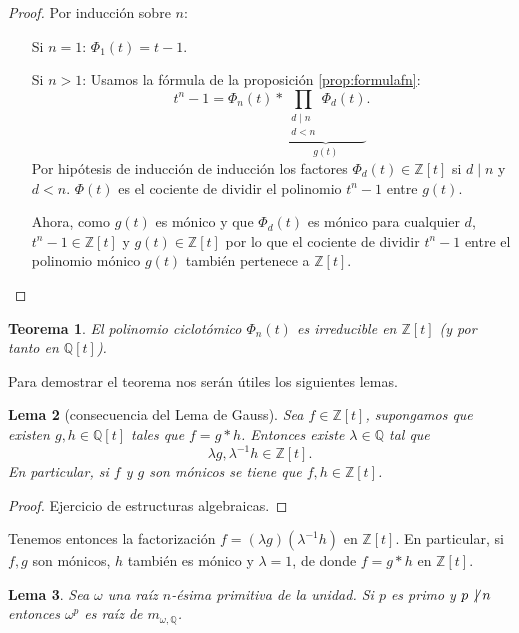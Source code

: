 \documentclass[10pt, spanish]{report}
\newtheorem{tma}{Teorema}[chapter]
\newtheorem{lema}[tma]{Lema}
\theoremstyle{definition}
\theoremstyle{custom}
\theoremstyle{remark}
\newcommand{\Z}{\mathbb{Z}}
\newcommand{\Q}{\mathbb{Q}}
\begin{document}
\begin{proof}
    Por inducción sobre $n$:
    \begin{itemize}[itemindent=30pt]
        \item[Si $n=1$:] $\Phi_1(t)=t-1$. 
        \item[Si $n>1$:] Usamos la fórmula de la proposición
            \ref{prop:formulafn}:
            \[ t^n-1 = \Phi_n(t)*\underbrace{\prod_{\substack{d\mid n\\ d<n}}
            \Phi_d(t)}_{g(t)}.\] 
            Por hipótesis de inducción de inducción los factores
            $\Phi_d(t)\in\Z[t]$ si $d\mid n$ y $d<n$. $\Phi(t)$ es el cociente
            de dividir el polinomio $t^n-1$ entre $g(t)$.       

            Ahora, como $g(t)$ es mónico y que $\Phi_d(t)$ es mónico para
            cualquier $d$, $t^n-1\in\Z[t]$ y $g(t)\in\Z[t]$ por lo que el
            cociente de dividir $t^n-1$ entre el polinomio mónico $g(t)$ también
            pertenece a $\Z[t]$. 
    \end{itemize}
\end{proof}

\begin{tma}\label{tma:pcicloirred}
    El polinomio ciclotómico $\Phi_n(t)$ es irreducible en $\Z[t]$ (y por tanto
    en $\Q[t]$). 
\end{tma}

Para demostrar el teorema nos serán útiles los siguientes lemas.

\begin{lema}[consecuencia del Lema de Gauss]\label{lema:gausszt}
    Sea $f\in\Z[t]$, supongamos que existen $g,h\in\Q[t]$ tales que $f=g*h$.
    Entonces existe $\lambda\in\Q$ tal que \[\lambda g, \lambda^{-1} h\in\Z[t].\]    
    En particular, si $f$ y $g$ son mónicos se tiene que $f,h\in\Z[t]$.   
\end{lema}

\begin{proof}
    Ejercicio de estructuras algebraicas.
\end{proof}

Tenemos entonces la factorización $f=(\lambda g)(\lambda^{-1} h)$ en $\Z[t]$. En
particular, si $f,g$ son mónicos, $h$ también es mónico y $\lambda=1$, de donde
$f=g*h$ en $\Z[t]$.  

\begin{lema}\label{lema:raicesprimitivas}
    Sea $\omega$ una raíz $n$-ésima primitiva de la unidad. Si $p$ es primo y
    $p\not\,\mid n$ entonces $\omega^p$ es raíz de $m_{\omega,\Q}$.
\end{lema}
\end{document}

